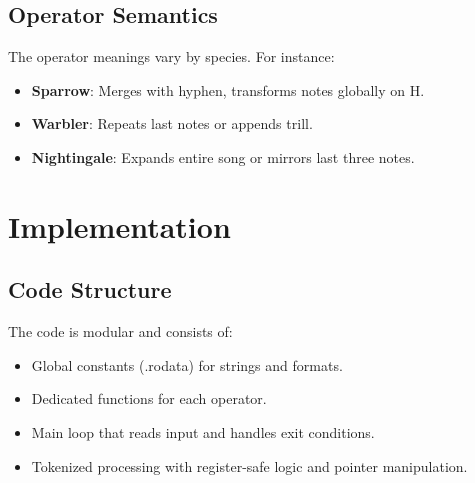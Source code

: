 \documentclass[11pt]{article}
\begin{document}
\subsection{Operator Semantics}
The operator meanings vary by species. For instance:
\begin{itemize}[noitemsep]
    \item \textbf{Sparrow}: Merges with hyphen, transforms notes globally on H.
    \item \textbf{Warbler}: Repeats last notes or appends trill.
    \item \textbf{Nightingale}: Expands entire song or mirrors last three notes.
\end{itemize}

\section{Implementation}
\subsection{Code Structure}
The code is modular and consists of:
\begin{itemize}[noitemsep]
    \item Global constants (.rodata) for strings and formats.
    \item Dedicated functions for each operator.
    \item Main loop that reads input and handles exit conditions.
    \item Tokenized processing with register-safe logic and pointer manipulation.
\end{itemize}
\end{document}
